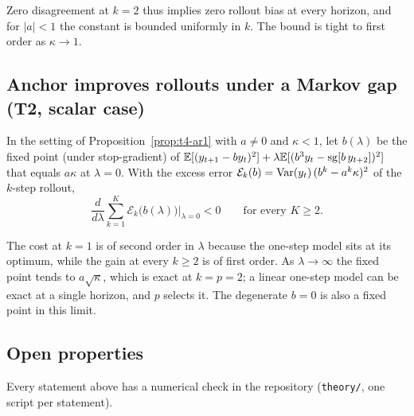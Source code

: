 Zero disagreement at $k = 2$ thus implies zero rollout bias at every horizon, and for $|a| < 1$ the constant is bounded uniformly in $k$. The bound is tight to first order as $\kappa \to 1$.

\subsection{Anchor improves rollouts under a Markov gap (T2, scalar case)}

\begin{proposition}
\label{prop:t2-ar1}
In the setting of Proposition~\ref{prop:t4-ar1} with $a \ne 0$ and $\kappa < 1$, let $b(\lambda)$ be the fixed point (under stop-gradient) of $\mathbb{E}[(y_{t+1} - b y_t)^2] + \lambda \mathbb{E}[(b^{3} y_t - \operatorname{sg}[b\, y_{t+2}])^2]$ that equals $a\kappa$ at $\lambda = 0$. With the excess error $\mathcal E_k(b) = \operatorname{Var}(y_t)\,(b^{k} - a^{k}\kappa)^2$ of the $k$-step rollout,
\begin{equation}
  \frac{d}{d\lambda} \sum_{k=1}^{K} \mathcal E_k\big(b(\lambda)\big) \Big|_{\lambda = 0} < 0 \qquad \text{for every } K \ge 2 .
\end{equation}
\end{proposition}

The cost at $k = 1$ is of second order in $\lambda$ because the one-step model sits at its optimum, while the gain at every $k \ge 2$ is of first order. As $\lambda \to \infty$ the fixed point tends to $a\sqrt{\kappa}$, which is exact at $k = p = 2$; a linear one-step model can be exact at a single horizon, and $p$ selects it. The degenerate $b = 0$ is also a fixed point in this limit. 

\subsection{Open properties}





Every statement above has a numerical check in the repository (\texttt{theory/}, one script per statement).
